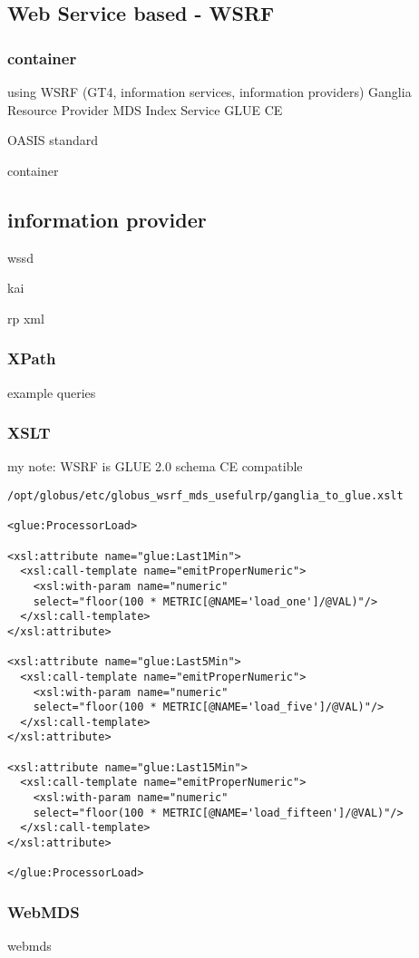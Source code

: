 \newpage

\subsection{Web Service based - WSRF}
\subsubsection{container}
using WSRF (GT4, information services, information providers)
Ganglia Resource Provider
MDS Index Service
GLUE CE 

OASIS standard

container
\newpage
\subsection{information provider}
wssd

kai

rp xml

\newpage
\subsubsection{XPath}
example queries
\subsubsection{XSLT}
my note: WSRF is GLUE 2.0 schema CE compatible
\begin{verbatim}
/opt/globus/etc/globus_wsrf_mds_usefulrp/ganglia_to_glue.xslt

<glue:ProcessorLoad>

<xsl:attribute name="glue:Last1Min">
  <xsl:call-template name="emitProperNumeric">
    <xsl:with-param name="numeric" 
    select="floor(100 * METRIC[@NAME='load_one']/@VAL)"/>
  </xsl:call-template>
</xsl:attribute>

<xsl:attribute name="glue:Last5Min">
  <xsl:call-template name="emitProperNumeric">
    <xsl:with-param name="numeric" 
    select="floor(100 * METRIC[@NAME='load_five']/@VAL)"/>
  </xsl:call-template>
</xsl:attribute>

<xsl:attribute name="glue:Last15Min">
  <xsl:call-template name="emitProperNumeric">
    <xsl:with-param name="numeric" 
    select="floor(100 * METRIC[@NAME='load_fifteen']/@VAL)"/>
  </xsl:call-template>
</xsl:attribute>

</glue:ProcessorLoad>
\end{verbatim}
\newpage

\subsubsection{WebMDS}
webmds